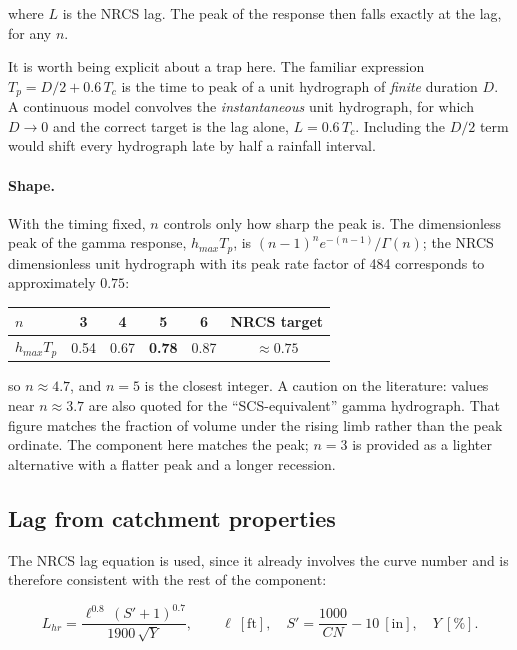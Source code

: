 \documentclass[11pt,a4paper]{article}
\begin{document}
\noindent
where $L$ is the NRCS lag. The peak of the response then falls exactly at the
lag, for any $n$.

It is worth being explicit about a trap here. The familiar expression
$T_p=D/2+0.6\,T_c$ is the time to peak of a unit hydrograph of \emph{finite}
duration $D$. A continuous model convolves the \emph{instantaneous} unit
hydrograph, for which $D\to0$ and the correct target is the lag alone,
$L=0.6\,T_c$. Including the $D/2$ term would shift every hydrograph late by
half a rainfall interval.

\paragraph{Shape.} With the timing fixed, $n$ controls only how sharp the peak
is. The dimensionless peak of the gamma response, $h_{max}T_p$, is
$(n-1)^{n}e^{-(n-1)}/\Gamma(n)$; the NRCS dimensionless unit hydrograph with
its peak rate factor of 484 corresponds to approximately $0.75$:

\begin{center}
\begin{tabular}{@{}lccccc@{}}
\toprule
$n$ & 3 & 4 & \textbf{5} & 6 & NRCS target\\
\midrule
$h_{max}T_p$ & 0.54 & 0.67 & \textbf{0.78} & 0.87 & $\approx0.75$\\
\bottomrule
\end{tabular}
\end{center}

\noindent
so $n\approx4.7$, and $n=5$ is the closest integer. A caution on the
literature: values near $n\approx3.7$ are also quoted for the
``SCS-equivalent'' gamma hydrograph. That figure matches the fraction of volume
under the rising limb rather than the peak ordinate. The component here matches
the peak; $n=3$ is provided as a lighter alternative with a flatter peak and a
longer recession.

\subsection{Lag from catchment properties}

The NRCS lag equation is used, since it already involves the curve number and
is therefore consistent with the rest of the component:

\begin{equation}
L_{hr}=\frac{\ell^{0.8}\,(S'+1)^{0.7}}{1900\,\sqrt{Y}},
\qquad \ell\ [\mathrm{ft}],\quad S'=\frac{1000}{CN}-10\ [\mathrm{in}],\quad Y\ [\%].
\end{equation}
\end{document}

